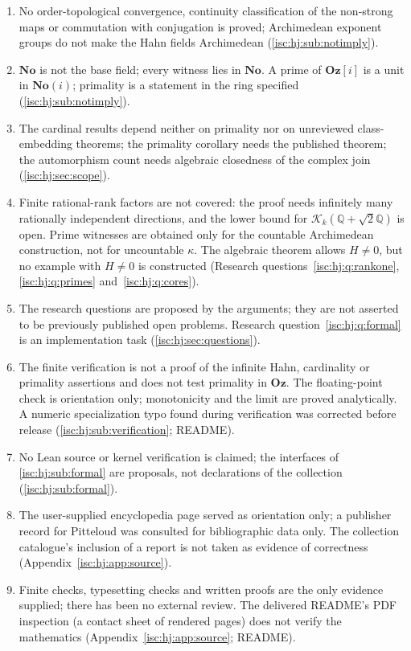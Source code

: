 \documentclass[11pt,letterpaper]{article}
\theoremstyle{definition}
\theoremstyle{remark}
\newcommand{\No}{\mathbf{No}}
\newcommand{\Oz}{\mathbf{Oz}}
\newcommand{\Q}{\mathbb Q}
\newcommand{\K}[2]{\mathcal K_{#1}(#2)}
\numberwithin{equation}{section}
\begin{document}
\begin{enumerate}[label=J\arabic*.,leftmargin=2.6em,itemsep=2pt]
verbatim to characteristic $p$ (\cref{isc:hj:sub:notimply}; Research
question~\ref{isc:hj:q:charp}).
\item No order-topological convergence, continuity classification of the
non-strong maps or commutation with conjugation is proved; Archimedean
exponent groups do not make the Hahn fields Archimedean
(\cref{isc:hj:sub:notimply}).
\item $\No$ is not the base field; every witness lies in $\No$. A prime of
$\Oz[i]$ is a unit in $\No(i)$; primality is a statement in the ring
specified (\cref{isc:hj:sub:notimply}).
\item The cardinal results depend neither on primality nor on unreviewed
class-embedding theorems; the primality corollary needs the published
theorem; the automorphism count needs algebraic closedness of the complex
join (\cref{isc:hj:sec:scope}).
\item Finite rational-rank factors are not covered: the proof needs
infinitely many rationally independent directions, and the lower bound for
$\K{k}{\Q+\sqrt2\Q}$ is open. Prime witnesses are obtained only for the
countable Archimedean construction, not for uncountable $\kappa$. The
algebraic theorem allows $H\ne0$, but no example with $H\ne0$ is
constructed (Research questions~\ref{isc:hj:q:rankone},
\ref{isc:hj:q:primes} and~\ref{isc:hj:q:cores}).
\item The research questions are proposed by the arguments; they are not
asserted to be previously published open problems. Research
question~\ref{isc:hj:q:formal} is an implementation task
(\cref{isc:hj:sec:questions}).
\item The finite verification is not a proof of the infinite Hahn,
cardinality or primality assertions and does not test primality in $\Oz$.
The floating-point check is orientation only; monotonicity and the limit
are proved analytically. A numeric specialization typo found during
verification was corrected before release (\cref{isc:hj:sub:verification};
README).
\item No Lean source or kernel verification is claimed; the interfaces of
\cref{isc:hj:sub:formal} are proposals, not declarations of the
collection (\cref{isc:hj:sub:formal}).
\item The user-supplied encyclopedia page served as orientation only; a
publisher record for Pitteloud was consulted for bibliographic data only.
The collection catalogue's inclusion of a report is not taken as evidence
of correctness (Appendix~\ref{isc:hj:app:source}).
\item Finite checks, typesetting checks and written proofs are the only
evidence supplied; there has been no external review. The delivered
README's PDF inspection (a contact sheet of rendered pages) does not
verify the mathematics (Appendix~\ref{isc:hj:app:source}; README).
\end{enumerate}
\end{document}
